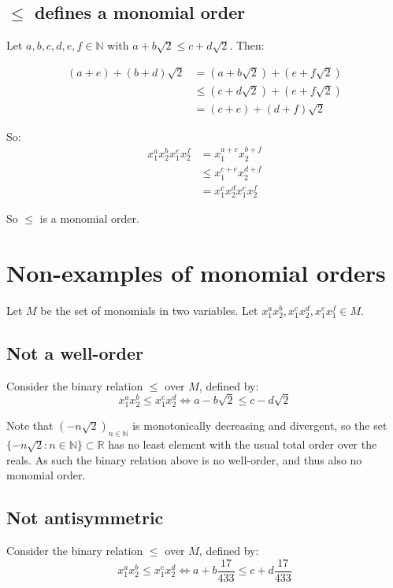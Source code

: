 \documentclass[a4paper]{scrreprt}
\begin{document}
\subsection{$\leq$ defines a monomial order}

Let $a, b, c, d, e, f \in \mathbb{N}$ with $a + b \sqrt{2} \leq c + d
\sqrt{2}$. Then:

\begin{align*}
		(a + e) + (b + d) \sqrt{2} & = (a + b \sqrt{2}) + (e + f \sqrt{2}) \\
								   & \leq (c + d \sqrt{2}) + (e + f \sqrt{2}) \\
								   & = (c + e) + (d + f) \sqrt{2}
\end{align*}

So:
\begin{align*}
		x_1^a x_2^b x_1^e x_2^f & = x_1^{a+e} x_2^{b+f} \\
								& \leq x_1^{c+e} x_2^{d+f} \\
								& = x_1^c x_2^d x_1^e x_2^f
\end{align*}

So $\leq$ is a monomial order.

\section{Non-examples of monomial orders}

Let $M$ be the set of monomials in two variables. Let $x_1^a x_2^b, x_1^c
x_2^d, x_1^e x_1^f \in M$.

\subsection{Not a well-order}

Consider the binary relation $\leq$ over $M$, defined by:
\[
		x_1^a x_2^b \leq x_1^c x_2^d \Leftrightarrow a - b \sqrt{2} \leq c - d \sqrt{2}
\]

Note that $(-n \sqrt{2})_{n \in \mathbb{N}}$ is monotonically decreasing and
divergent, so the set $\{-n \sqrt{2} : n \in \mathbb{N}\} \subset \mathbb{R}$
has no least element with the usual total order over the reals. As such the
binary relation above is no well-order, and thus also no monomial order.

\subsection{Not antisymmetric}


Consider the binary relation $\leq$ over $M$, defined by:
\[
		x_1^a x_2^b \leq x_1^c x_2^d \Leftrightarrow a + b \frac{17}{433} \leq c + d \frac{17}{433}
\]
\end{document}
